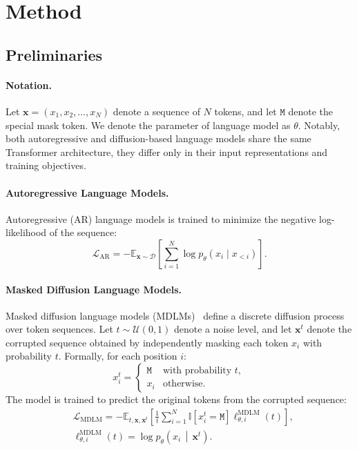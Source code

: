 \section{Method}

\subsection{Preliminaries}

\paragraph{Notation.}
Let $\mathbf{x} = (x_1, x_2, \ldots, x_N)$ denote a sequence of $N$ tokens, and let $\mathtt{M}$ denote the special mask token.
We denote the parameter of language model as $\theta$.
Notably, both autoregressive and diffusion-based language models share the same Transformer architecture, they differ only in their input representations and training objectives.

\paragraph{Autoregressive Language Models.}
Autoregressive (AR) language models is trained to minimize the negative log-likelihood of the sequence:
\begin{equation}
    \mathcal{L}_{\text{AR}} = -\mathbb{E}_{\mathbf{x} \sim \mathcal{D}} \left[ \sum_{i=1}^{N} \log p_{\theta}(x_i \mid x_{<i}) \right].
\end{equation}

\paragraph{Masked Diffusion Language Models.}
Masked diffusion language models (MDLMs)~\citep{llada} define a discrete diffusion process over token sequences.
Let $t\sim\mathcal{U}(0,1)$ denote a noise level, and let
$\mathbf{x}^t$ denote the corrupted sequence obtained by independently
masking each token $x_i$ with probability $t$.
Formally, for each position $i$:
\begin{equation}
    x_i^{t} =
    \begin{cases}
        \mathtt{M} & \text{with probability } t, \\
        x_i & \text{otherwise}.
    \end{cases}
\end{equation}
The model is trained to predict the original tokens from the corrupted sequence:
\begin{equation}
\begin{aligned}
&\mathcal{L}_{\mathrm{MDLM}}
=
-\mathbb{E}_{t,\mathbf{x},\mathbf{x}^{t}}
\left[
\frac{1}{t}
\sum_{i=1}^{N}
\mathbb{I}\!\left[x_i^{t}=\mathtt{M}\right]
\ell_{\theta,i}^{\mathrm{MDLM}}(t)
\right], \\
&\ell_{\theta,i}^{\mathrm{MDLM}}(t)
=
\log p_{\theta}
\left(
x_i
\,\middle|\,
\mathbf{x}^{t}
\right).
\end{aligned}
\label{eq:mdlm_loss}
\end{equation}



